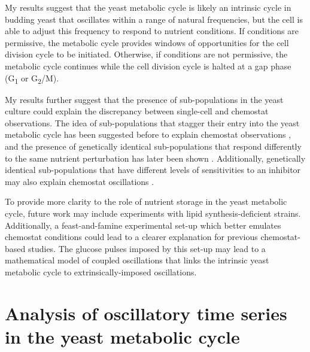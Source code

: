My results suggest that the yeast metabolic cycle is likely an intrinsic cycle in budding yeast that oscillates within a range of natural frequencies, but the cell is able to adjust this frequency to respond to nutrient conditions.
If conditions are permissive, the metabolic cycle provides windows of opportunities for the cell division cycle to be initiated.
Otherwise, if conditions are not permissive, the metabolic cycle continues while the cell division cycle is halted at a gap phase (G\textsubscript{1} or G\textsubscript{2}/M).

My results further suggest that the presence of sub-populations in the yeast culture could explain the discrepancy between single-cell and chemostat observations.
The idea of sub-populations that stagger their entry into the yeast metabolic cycle has been suggested before to explain chemostat observations \parencite{burnettiCellCycleStart2016}, and the presence of genetically identical sub-populations that respond differently to the same nutrient perturbation has later been shown \parencite{bagameryPutativeBetHedgingStrategy2020}.
Additionally, genetically identical sub-populations that have different levels of sensitivities to an inhibitor may also explain chemostat oscillations \parencite{smithTheoryChemostatDynamics1995}.

To provide more clarity to the role of nutrient storage in the yeast metabolic cycle, future work may include experiments with lipid synthesis-deficient strains.
Additionally, a feast-and-famine experimental set-up which better emulates chemostat conditions could lead to a clearer explanation for previous chemostat-based studies.
The glucose pulses imposed by this set-up may lead to a mathematical model of coupled oscillations that links the intrinsic yeast metabolic cycle to extrinsically-imposed oscillations.


\section{Analysis of oscillatory time series in the yeast metabolic cycle}
\label{sec:concl-analysis}


